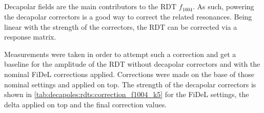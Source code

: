 


\subsection{}
\label{section:decapoles:decapolar_contribution_correction}

Decapolar fields are the main contributors to the RDT $f_{1004}$. As such, powering the decapolar
correctors is a good way to correct the related resonances.
Being linear with the strength of the correctors, the RDT can be corrected via a response matrix.

Measurements were taken in order to attempt such a correction and get a baseline for the amplitude
of the RDT without decapolar correctors and with the nominal FiDeL corrections applied.
Corrections were made on the base of those nominal settings and applied on top. The strength of the
decapolar correctors is shown in \cref{tab:decapoles:rdts:correction_f1004_k5} for the FiDeL
settings, the delta applied on top and the final correction values.


